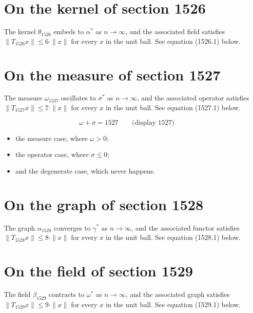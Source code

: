 \documentclass{article}
\begin{document}
\section{On the kernel of section 1526}
The kernel $\theta_{1526}$ embeds to $\alpha^{*}$ as $n \to \infty$,
and the associated field satisfies $\|T_{1526} x\| \leq 6 \cdot \|x\|$
for every $x$ in the unit ball. See equation (1526.1) below.

\section{On the measure of section 1527}
The measure $\omega_{1527}$ oscillates to $\sigma^{*}$ as $n \to \infty$,
and the associated operator satisfies $\|T_{1527} x\| \leq 7 \cdot \|x\|$
for every $x$ in the unit ball. See equation (1527.1) below.

$$
\omega + \sigma = 1527 \qquad \text{(display 1527)}
$$

\begin{itemize}
  \item the measure case, where $\omega > 0$;
  \item the operator case, where $\sigma \leq 0$;
  \item and the degenerate case, which never happens.
\end{itemize}

\section{On the graph of section 1528}
The graph $\alpha_{1528}$ converges to $\gamma^{*}$ as $n \to \infty$,
and the associated functor satisfies $\|T_{1528} x\| \leq 8 \cdot \|x\|$
for every $x$ in the unit ball. See equation (1528.1) below.

\section{On the field of section 1529}
The field $\beta_{1529}$ contracts to $\omega^{*}$ as $n \to \infty$,
and the associated graph satisfies $\|T_{1529} x\| \leq 9 \cdot \|x\|$
for every $x$ in the unit ball. See equation (1529.1) below.
\end{document}
